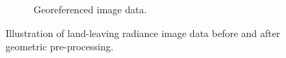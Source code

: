 \begin{figure}[thb]
\begin{subfigure}[t]{.52\linewidth}
		\caption{Georeferenced image data.}		
		\label{fig:QuartzByTASI}
	\end{subfigure}
	\vspace{1.5 em}
	\caption{Illustration of land-leaving radiance image data before and after geometric pre-processing.}
	\label{fig:Georeferencing}
\end{figure}


